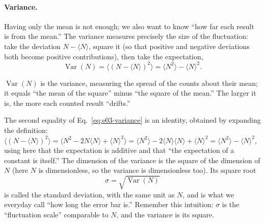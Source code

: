 \paragraph{Variance.}
Having only the mean is not enough; we also want to know ``how far each result is from the mean.'' The variance measures precisely the size of the fluctuation: take the deviation $N-\langle N\rangle$, square it (so that positive and negative deviations both become positive contributions), then take the expectation,
\begin{equation}
  \operatorname{Var}(N)=\big\langle (N-\langle N\rangle)^2\big\rangle
  =\langle N^2\rangle-\langle N\rangle^2 .
  \label{eq:e03-variance}
\end{equation}
\begin{formulaexplain}
$\operatorname{Var}(N)$ is the variance, measuring the spread of the counts about their mean; it equals ``the mean of the square'' minus ``the square of the mean.'' The larger it is, the more each counted result ``drifts.''
\end{formulaexplain}
The second equality of Eq.~\eqref{eq:e03-variance} is an identity, obtained by expanding the definition: $\langle(N-\langle N\rangle)^2\rangle=\langle N^2-2N\langle N\rangle+\langle N\rangle^2\rangle=\langle N^2\rangle-2\langle N\rangle\langle N\rangle+\langle N\rangle^2=\langle N^2\rangle-\langle N\rangle^2$, using here that the expectation is additive and that ``the expectation of a constant is itself.'' The dimension of the variance is the square of the dimension of $N$ (here $N$ is dimensionless, so the variance is dimensionless too). Its square root
\[
  \sigma=\sqrt{\operatorname{Var}(N)}
\]
is called the standard deviation, with the same unit as $N$, and is what we everyday call ``how long the error bar is.'' Remember this intuition: $\sigma$ is the ``fluctuation scale'' comparable to $N$, and the variance is its square.

